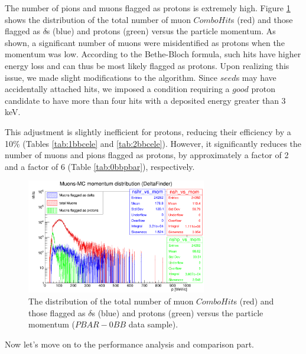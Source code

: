 The number of pions and muons flagged as protons is extremely high. 
Figure \ref{fig:0pbarbefore} shows the distribution of the total 
number of muon $ComboHit$s (red) and those flagged as $\delta$s (blue) 
and protons (green) versus the particle momentum. 
As shown, a significant number of muons were misidentified 
as protons when the momentum was low. 
According to the Bethe-Bloch formula, such hits have 
higher energy loss and can thus be most likely flagged as 
protons. Upon realizing this issue, we made slight modifications to the 
algorithm. Since $seed$s may have accidentally attached hits, we imposed a 
condition requiring a $good$ proton candidate to have more than four 
hits with a deposited energy greater than 3 keV.

This adjustment is slightly inefficient for protons, reducing their 
efficiency by a 10\% (Tables \ref{tab:1bbcele} and \ref{tab:2bbcele}). 
However, it significantly reduces the 
number of muons and pions flagged as protons, by approximately 
a factor of 2 and a factor of 6 (Table \ref{tab:0bbpbar}), respectively.

 \begin{figure}[!h]
            \centering
            \includegraphics[width =0.7\textwidth]{figures/png/Screenshot_20240805_222923.png}
        \caption[The distribution of the total and flagged number of muon $ComboHit$s versus momentum.]{The 
        distribution of the total number of muon $ComboHit$s 
        (red) and those flagged as $\delta$s (blue) 
        and protons (green) versus the particle momentum ($PBAR-0BB$ data sample). }
           \label{fig:0pbarbefore}
\end{figure}

Now let's move on to the performance analysis and comparison part.

